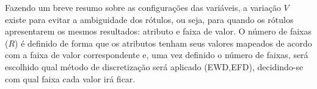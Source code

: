 Fazendo um breve resumo sobre as configurações das variáveis, a variação ${V}$ existe para evitar a ambiguidade dos rótulos, ou seja, para quando os rótulos apresentarem os mesmos resultados: atributo e faixa de valor. O número de faixas (${R}$) é definido de forma que os atributos tenham seus valores mapeados de acordo com a faixa de valor correspondente e, uma vez definido o número de faixas, será escolhido qual método de discretização será aplicado (EWD,EFD), decidindo-se com qual faixa cada valor irá ficar.








